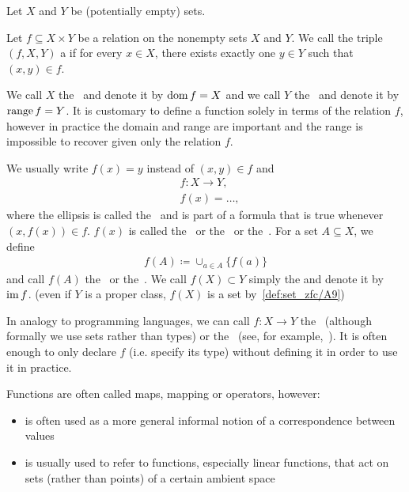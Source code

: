 \begin{definition}\label{def:function}
  Let $X$ and $Y$ be (potentially empty) sets.

  Let $f \subseteq X \times Y$ be a relation on the nonempty sets $X$ and $Y$. We call the triple $(f, X, Y)$ a  if for every $x \in X$, there exists exactly one $y \in Y$ such that $(x, y) \in f$.

  We call $X$ the~ and denote it by $\operatorname{dom} f = X$ and we call $Y$ the~ and denote it by $\operatorname{range} f = Y$. It is customary to define a function solely in terms of the relation $f$, however in practice the domain and range are important and the range is impossible to recover given only the relation $f$.

  We usually write $f(x) = y$ instead of $(x, y) \in f$ and
  \begin{align*}
    &f: X \to Y, \\
    &f(x) = \ldots,
  \end{align*}
  where the ellipsis is called the~ and is part of a formula that is true whenever $(x, f(x)) \in f$. $f(x)$ is called the~ or the~ or the~. For a set $A \subseteq X$, we define
  \begin{align*}
    f(A) \coloneqq \cup_{a \in A} \{ f(a) \}
  \end{align*}
  and call $f(A)$ the~ or the~. We call $f(X) \subset Y$ simply the  and denote it by $\operatorname{im} f$. (even if $Y$ is a proper class, $f(X)$ is a set by~\cref{def:set_zfc/A9})

  In analogy to programming languages, we can call $f: X \to Y$ the~ (although formally we use sets rather than types) or the~ (see, for example,~\cite[section 2.4]{Kernighan1988}). It is often enough to only declare $f$ (i.e. specify its type) without defining it in order to use it in practice.

  Functions are often called maps, mapping or operators, however:
  \begin{itemize}
    \item {} is often used as a more general informal notion of a correspondence between values
    \item {} is usually used to refer to functions, especially linear functions, that act on sets (rather than points) of a certain ambient space
  \end{itemize}


\end{definition}
